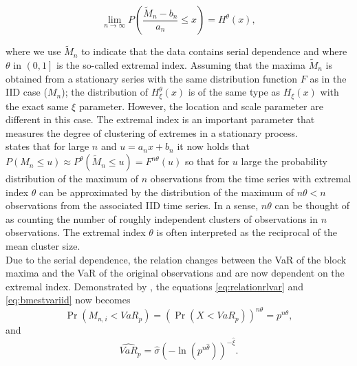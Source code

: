 \documentclass[a4paper,12pt]{article}
\theoremstyle{plain}
\begin{document}
\begin{equation}
    \lim_{n\to\infty} P\left(\frac{\tilde{M}_n-b_n}{a_n}\leq x\right)=H^{\theta}\left(x\right),
\end{equation}

\noindent where we use $\tilde{M}_n$ to indicate that the data contains serial dependence and where $\theta$ in $\left(0, 1\right]$ is the so-called extremal index. Assuming that the maxima $\tilde{M}_n$ is obtained from a stationary series with the same distribution function $F$ as in the IID case ($M_n$); the distribution of $H_{\xi}^{\theta}\left(x\right)$ is of the same type as $H_{\xi}\left(x\right)$ with the exact same $\xi$ parameter. However, the location and scale parameter are different in this case. The extremal index is an important parameter that measures the degree of clustering of extremes in a stationary process.\\

 states that for large $n$ and $u=a_nx+b_n$ it now holds that $P\left(M_n\leq u\right)\approx P^{\theta}\left(\tilde{M}_n\leq u\right)=F^{n\theta}\left(u\right)$ so that for $u$ large the probability distribution of the maximum of $n$ observations from the time series with extremal index $\theta$ can be approximated by the distribution of the maximum of $n\theta<n$ observations from the associated IID time series. In a sense, $n\theta$ can be thought of as counting the number of roughly independent clusters of observations in $n$ observations. The extremal index $\theta$ is often interpreted as the reciprocal of the mean cluster size.
\\

Due to the serial dependence, the relation changes between the VaR of the block maxima and the VaR of the original observations and are now dependent on the extremal index. Demonstrated by , the equations \eqref{eq:relationrlvar} and \eqref{eq:bmestvariid} now becomes
\begin{equation}
    \Pr\left(M_{n,i}<VaR_p\right)=\left(\Pr\left(X<VaR_p\right)\right)^{n\theta}=p^{n\theta},
    \label{eq:relationrlvar2}
\end{equation}
\noindent and
\begin{equation}
    \widehat{VaR}_p = \hat{\sigma}\left(-\ln{\left(p^{n\hat{\theta}}\right)}\right)^{-\hat{\xi}}.
    \label{eq:bmestvarserialdep}
\end{equation}
\\
\end{document}

